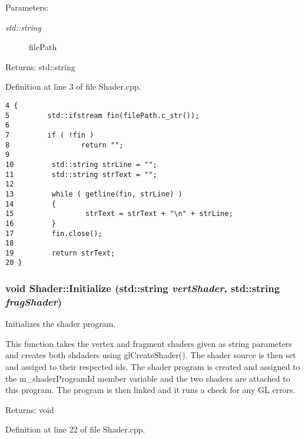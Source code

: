 \begin{Desc}
\item[Parameters:]
\begin{description}
\item[{\em std::string}]filePath \end{description}
\end{Desc}
\begin{Desc}
\item[Returns:]std::string \end{Desc}


Definition at line 3 of file Shader.cpp.

\begin{Code}\begin{verbatim}4 {
5         std::ifstream fin(filePath.c_str());
6 
7         if ( !fin )
8                 return "";
9 
10         std::string strLine = "";
11         std::string strText = "";
12 
13         while ( getline(fin, strLine) )
14         {
15                 strText = strText + "\n" + strLine;
16         }
17         fin.close();
18 
19         return strText;
20 }
\end{verbatim}
\end{Code}


\hypertarget{class_shader_750cae45b47ecb6d8b8ae334562e7c6f}{
\subsubsection[Initialize]{\setlength{\rightskip}{0pt plus 5cm}void Shader::Initialize (std::string {\em vertShader}, \/  std::string {\em fragShader})}}
\label{class_shader_750cae45b47ecb6d8b8ae334562e7c6f}


Initializes the shader program. 

This function takes the vertex and fragment shaders given as string parameters and creates both shdaders using glCreateShader(). The shader source is then set and assiged to their respected ids. The shader program is created and assigned to the m\_\-shaderProgramId member variable and the two shaders are attached to this program. The program is then linked and it runs a check for any GL errors.

\begin{Desc}
\item[Returns:]void \end{Desc}


Definition at line 22 of file Shader.cpp.

